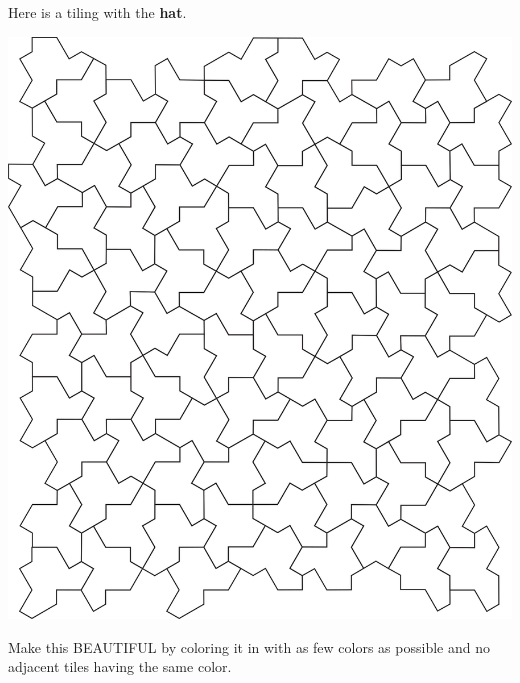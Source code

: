 \documentclass[noauthor,nooutcomes,handout,hints,12pt]{ximera}
\begin{document}
\begin{question}
  Here is a tiling with the \textbf{hat}.
  \begin{center}
    \includegraphics{hat.png}
  \end{center}
  Make this BEAUTIFUL by coloring it in with as few colors as possible
  and no adjacent tiles having the same color.
\end{question}
\mynewpage
\end{document}
